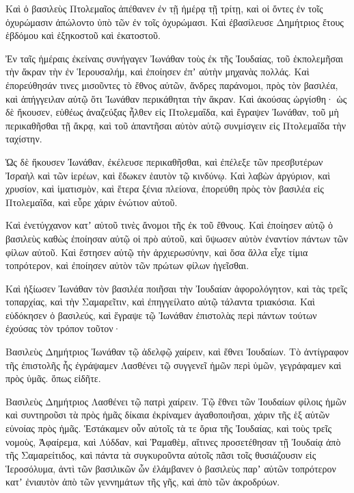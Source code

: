 {\par }{\PP {}Καὶ ὁ βασιλεὺς Πτολεμαῖος ἀπέθανεν ἐν τῇ ἡμέρᾳ τῇ τρίτῃ, καὶ οἱ ὄντες ἐν τοῖς ὀχυρώμασιν ἀπώλοντο ὑπὸ τῶν ἐν τοῖς ὀχυρώμασι.
Καὶ ἐβασίλευσε Δημήτριος ἔτους ἑβδόμου καὶ ἑξηκοστοῦ καὶ ἑκατοστοῦ.
\par }{\PP {}Ἐν ταῖς ἡμέραις ἐκείναις συνήγαγεν Ἰωνάθαν τοὺς ἐκ τῆς Ἰουδαίας, τοῦ ἐκπολεμῆσαι τὴν ἄκραν τὴν ἐν Ἱερουσαλήμ, καὶ ἐποίησεν ἐπʼ αὐτὴν μηχανὰς πολλάς.
Καὶ ἐπορεύθησάν τινες μισοῦντες τὸ ἔθνος αὐτῶν, ἄνδρες παράνομοι, πρὸς τὸν βασιλέα, καὶ ἀπήγγειλαν αὐτῷ ὅτι Ἰωνάθαν περικάθηται τὴν ἄκραν.
Καὶ ἀκούσας ὠργίσθη· ὡς δὲ ἤκουσεν, εὐθέως ἀναζεύξας ἦλθεν εἰς Πτολεμαΐδα, καὶ ἔγραψεν Ἰωνάθαν, τοῦ μὴ περικαθῆσθαι τῇ ἄκρᾳ, καὶ τοῦ ἀπαντῆσαι αὐτὸν αὐτῷ συνμίσγειν εἰς Πτολεμαΐδα τὴν ταχίστην.
\par }{\PP {}Ὡς δὲ ἤκουσεν Ἰωνάθαν, ἐκέλευσε περικαθῆσθαι, καὶ ἐπέλεξε τῶν πρεσβυτέρων Ἰσραὴλ καὶ τῶν ἱερέων, καὶ ἔδωκεν ἑαυτὸν τῷ κινδύνῳ.
Καὶ λαβὼν ἀργύριον, καὶ χρυσίον, καὶ ἱματισμὸν, καὶ ἕτερα ξένια πλείονα, ἐπορεύθη πρὸς τὸν βασιλέα εἰς Πτολεμαΐδα, καὶ εὗρε χάριν ἑνώτιον αὐτοῦ.
\par }{\PP {}Καὶ ἐνετύγχανον κατʼ αὐτοῦ τινὲς ἄνομοι τῆς ἐκ τοῦ ἔθνους.
Καὶ ἐποίησεν αὐτῷ ὁ βασιλεὺς καθὼς ἐποίησαν αὐτῷ οἱ πρὸ αὐτοῦ, καὶ ὕψωσεν αὐτὸν ἐναντίον πάντων τῶν φίλων αὐτοῦ.
Καὶ ἔστησεν αὐτῷ τὴν ἀρχιερωσύνην, καὶ ὅσα ἄλλα εἶχε τίμια τοπρότερον, καὶ ἐποίησεν αὐτὸν τῶν πρώτων φίλων ἡγεῖσθαι.
\par }{\PP {}Καὶ ἠξίωσεν Ἰωνάθαν τὸν βασιλέα ποιῆσαι τὴν Ἰουδαίαν ἀφορολόγητον, καὶ τὰς τρεῖς τοπαρχίας, καὶ τὴν Σαμαρεῖτιν, καὶ ἐπηγγείλατο αὐτῷ τάλαντα τριακόσια.
Καὶ εὐδόκησεν ὁ βασιλεύς, καὶ ἔγραψε τῷ Ἰωνάθαν ἐπιστολὰς περὶ πάντων τούτων ἐχούσας τὸν τρόπον τοῦτον·
\par }{\PP {}Βασιλεὺς Δημήτριος Ἰωνάθαν τῷ ἀδελφῷ χαίρειν, καὶ ἔθνει Ἰουδαίων.
Τὸ ἀντίγραφον τῆς ἐπιστολῆς ἧς ἐγράψαμεν Λασθένει τῷ συγγενεῖ ἡμῶν περὶ ὑμῶν, γεγράφαμεν καὶ πρὸς ὑμᾶς. ὅπως εἰδῆτε.
\par }{\PP {}Βασιλεὺς Δημήτριος Λασθένει τῷ πατρὶ χαίρειν.
Τῷ ἔθνει τῶν Ἰουδαίων φίλοις ἡμῶν καὶ συντηροῦσι τὰ πρὸς ἡμᾶς δίκαια ἐκρίναμεν ἀγαθοποιῆσαι, χάριν τῆς ἑξ αὐτῶν εὐνοίας πρὸς ἡμᾶς.
Ἑστάκαμεν οὖν αὐτοῖς τὰ τε ὅρια τῆς Ἰουδαίας, καὶ τοὺς τρεῖς νομοὺς, Ἀφαίρεμα, καὶ Λύδδαν, καὶ Ῥαμαθὲμ, αἵτινες προσετέθησαν τῇ Ἰουδαίᾳ ἀπὸ τῆς Σαμαρείτιδος, καὶ πάντα τὰ συγκυροῦντα αὐτοῖς πᾶσι τοῖς θυσιάζουσιν εἰς Ἱεροσόλυμα, ἀντὶ τῶν βασιλικῶν ὧν ἐλάμβανεν ὁ βασιλεὺς παρʼ αὐτῶν τοπρότερον κατʼ ἐνιαυτὸν ἀπὸ τῶν γεννημάτων τῆς γῆς, καὶ ἀπὸ τῶν ἀκροδρύων.
}

